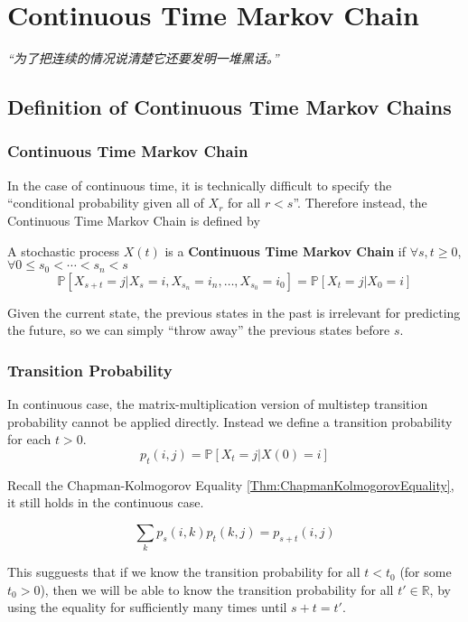 \chapter{Continuous Time Markov Chain}
\emph{“为了把连续的情况说清楚它还要发明一堆黑话。”}
\newpage


\section{Definition of Continuous Time Markov Chains}
    \subsection{Continuous Time Markov Chain}
        In the case of continuous time, it is technically difficult to specify the ``conditional probability given all of $X_r$ for all $r<s$''. Therefore instead, the Continuous Time Markov Chain is defined by

        \begin{definition}\label{Def:ContinuousTimeMarkovChain}
            A stochastic process $X(t)$ is a \textbf{Continuous Time Markov Chain} if $\forall s,t \ge 0$, $\forall 0 \le s_0 < \cdots < s_n < s$
            \[ \mathbb{P}[X_{s+t} = j | X_s = i, X_{s_n} = i_n,\dots,X_{s_0}=i_0] = \mathbb{P}[X_t=j | X_0 = i] \]
        \end{definition}

        Given the current state, the previous states in the past is irrelevant for predicting the future, so we can simply ``throw away'' the previous states before $s$.

    \subsection{Transition Probability}
        In continuous case, the matrix-multiplication version of multistep transition probability cannot be applied directly. Instead we define a transition probability for each $t>0$.
        \[ p_t(i,j) = \mathbb{P}[X_t=j|X(0)=i] \]

        Recall the Chapman-Kolmogorov Equality \ref{Thm:ChapmanKolmogorovEquality}, it still holds in the continuous case.

        \begin{theorem}\label{Thm:ContinuousChapmanKolmogorovEquality}
            \[ \sum_{k}p_s(i,k)p_t(k,j) = p_{s+t}(i,j) \]
        \end{theorem}
        \begin{remark}
            This sugguests that if we know the transition probability for all $t<t_0$ (for some $t_0>0$), then we will be able to know the transition probability for all $t' \in \mathbb{R}$, by using the equality for sufficiently many times until $s+t=t'$.
        \end{remark}

